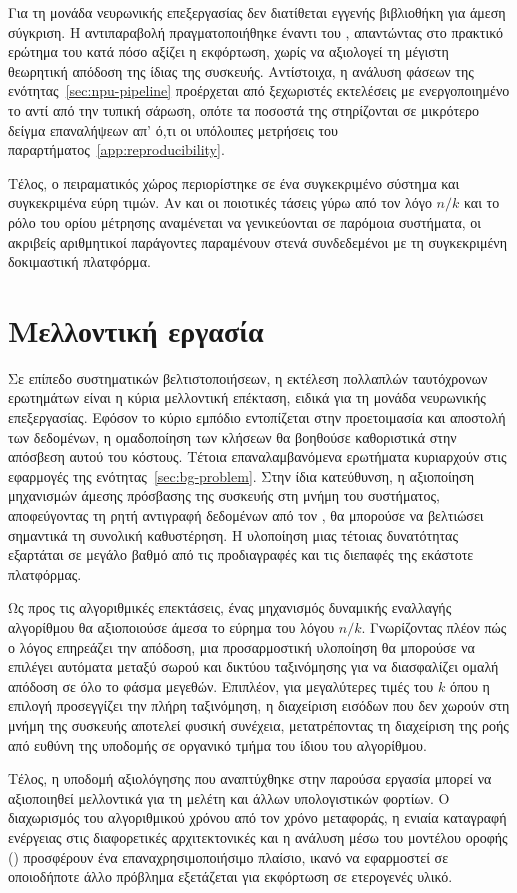 Για τη μονάδα νευρωνικής επεξεργασίας δεν διατίθεται εγγενής βιβλιοθήκη
 για άμεση σύγκριση. Η αντιπαραβολή πραγματοποιήθηκε έναντι του
, απαντώντας στο πρακτικό ερώτημα του κατά πόσο αξίζει η εκφόρτωση,
χωρίς να αξιολογεί τη μέγιστη θεωρητική απόδοση της ίδιας της συσκευής.
Αντίστοιχα, η ανάλυση φάσεων της ενότητας~\ref{sec:npu-pipeline} προέρχεται από
ξεχωριστές εκτελέσεις με ενεργοποιημένο το  αντί από την τυπική
σάρωση, οπότε τα ποσοστά της στηρίζονται σε μικρότερο δείγμα επαναλήψεων απ'
ό,τι οι υπόλοιπες μετρήσεις του παραρτήματος~\ref{app:reproducibility}.

Τέλος, ο πειραματικός χώρος περιορίστηκε σε ένα συγκεκριμένο σύστημα και
συγκεκριμένα εύρη τιμών. Αν και οι ποιοτικές τάσεις γύρω από τον λόγο $n/k$ και
το ρόλο του ορίου μέτρησης αναμένεται να γενικεύονται σε παρόμοια συστήματα, οι
ακριβείς αριθμητικοί παράγοντες παραμένουν στενά συνδεδεμένοι με τη
συγκεκριμένη δοκιμαστική πλατφόρμα.

\clearpage

\section{Μελλοντική εργασία}
\label{sec:concl-future}

Σε επίπεδο συστηματικών βελτιστοποιήσεων, η εκτέλεση πολλαπλών ταυτόχρονων
ερωτημάτων  είναι η κύρια μελλοντική επέκταση, ειδικά για τη μονάδα
νευρωνικής επεξεργασίας. Εφόσον το κύριο εμπόδιο εντοπίζεται στην προετοιμασία
και αποστολή των δεδομένων, η ομαδοποίηση των κλήσεων θα βοηθούσε καθοριστικά
στην απόσβεση αυτού του κόστους. Τέτοια επαναλαμβανόμενα ερωτήματα κυριαρχούν
στις εφαρμογές της ενότητας~\ref{sec:bg-problem}. Στην ίδια κατεύθυνση, η
αξιοποίηση μηχανισμών άμεσης πρόσβασης της συσκευής στη μνήμη του συστήματος,
αποφεύγοντας τη ρητή αντιγραφή δεδομένων από τον , θα μπορούσε να
βελτιώσει σημαντικά τη συνολική καθυστέρηση. Η υλοποίηση μιας τέτοιας
δυνατότητας εξαρτάται σε μεγάλο βαθμό από τις προδιαγραφές και τις διεπαφές της
εκάστοτε πλατφόρμας.

Ως προς τις αλγοριθμικές επεκτάσεις, ένας μηχανισμός δυναμικής εναλλαγής
αλγορίθμου θα αξιοποιούσε άμεσα το εύρημα του λόγου $n/k$. Γνωρίζοντας πλέον
πώς ο λόγος επηρεάζει την απόδοση, μια προσαρμοστική υλοποίηση θα μπορούσε να
επιλέγει αυτόματα μεταξύ σωρού και δικτύου ταξινόμησης για να διασφαλίζει ομαλή
απόδοση σε όλο το φάσμα μεγεθών. Επιπλέον, για μεγαλύτερες τιμές του $k$ όπου η
επιλογή προσεγγίζει την πλήρη ταξινόμηση, η διαχείριση εισόδων που δεν χωρούν
στη μνήμη της συσκευής αποτελεί φυσική συνέχεια, μετατρέποντας τη διαχείριση
της ροής από ευθύνη της υποδομής σε οργανικό τμήμα του ίδιου του αλγορίθμου.

Τέλος, η υποδομή αξιολόγησης που αναπτύχθηκε στην παρούσα εργασία μπορεί να
αξιοποιηθεί μελλοντικά για τη μελέτη και άλλων υπολογιστικών φορτίων. Ο
διαχωρισμός του αλγοριθμικού χρόνου από τον χρόνο μεταφοράς, η ενιαία καταγραφή
ενέργειας στις διαφορετικές αρχιτεκτονικές και η ανάλυση μέσω του μοντέλου
οροφής () προσφέρουν ένα επαναχρησιμοποιήσιμο πλαίσιο, ικανό να
εφαρμοστεί σε οποιοδήποτε άλλο πρόβλημα εξετάζεται για εκφόρτωση σε ετερογενές
υλικό.
